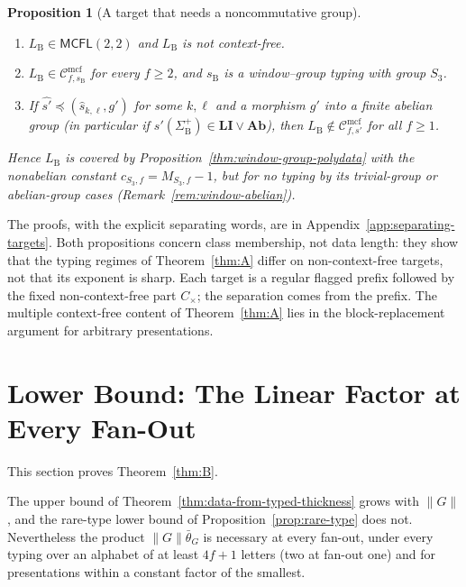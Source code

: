 \documentclass[11pt]{article}
\numberwithin{equation}{section}
\theoremstyle{plain}
\newtheorem{proposition}[theorem]{Proposition}
\theoremstyle{definition}
\theoremstyle{remark}
\newcommand{\Cmcf}[2]{\mathcal{C}^{\mathrm{mcf}}_{#1,#2}}
\theoremstyle{plain}
\begin{document}
\begin{proposition}[A target that needs a noncommutative group]
\label{prop:nonabelian-needed-target}
\begin{enumerate}[label=\textup{(\roman*)},leftmargin=*]
\item $L_{\mathrm B}\in\mathsf{MCFL}(2,2)$ and $L_{\mathrm B}$ is not context-free.
\item $L_{\mathrm B}\in\Cmcf{f}{s_{\mathrm B}}$ for every $f\ge2$, and $s_{\mathrm B}$ is
a window--group typing with group $S_3$.
\item If $\widehat{s'}\preceq(\widehat s_{k,\ell},g')$ for some $k,\ell$ and a
morphism $g'$ into a finite \emph{abelian} group (in particular if
$s'(\Sigma_{\mathrm B}^+)\in\mathbf{LI}\vee\mathbf{Ab}$), then
$L_{\mathrm B}\notin\Cmcf{f}{s'}$ for all $f\ge1$.
\end{enumerate}
Hence $L_{\mathrm B}$ is covered by Proposition~\ref{thm:window-group-polydata} with the
nonabelian constant $c_{S_3,f}=M_{S_3,f}-1$, but for no typing by its trivial-group or
abelian-group cases (Remark~\ref{rem:window-abelian}).
\end{proposition}

The proofs, with the explicit separating words, are in
Appendix~\ref{app:separating-targets}.  Both propositions concern class
membership, not data length: they show that the typing regimes of
Theorem~\ref{thm:A} differ on non-context-free targets, not that its exponent is
sharp.  Each target is a regular flagged prefix followed by the fixed
non-context-free part $C_\times$; the separation comes from the prefix.  The multiple context-free content of Theorem~\ref{thm:A} lies in
the block-replacement argument for arbitrary presentations.

\section{Lower Bound: The Linear Factor at Every Fan-Out}
\label{sec:linear}

This section proves Theorem~\ref{thm:B}.

The upper bound of Theorem~\ref{thm:data-from-typed-thickness} grows with
$\|G\|$, and the rare-type lower bound of Proposition~\ref{prop:rare-type} does not.  Nevertheless the product $\|G\|\bar\theta_G$ is
necessary at every fan-out, under every typing over an alphabet of at least
$4f+1$ letters (two at fan-out one) and for presentations within a constant factor
of the smallest.
\end{document}
